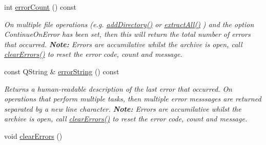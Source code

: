 \begin{DoxyCompactItemize}
int \hyperlink{class_ab_zip_ae32a8a92d2cc267e2c57705e95fafc05}{error\+Count} () const 
\begin{DoxyCompactList}\small\item\em On multiple file operations (e.\+g. \hyperlink{class_ab_zip_adf2414a410a25ef82ac7349b0a2d1c97}{add\+Directory()} or \hyperlink{class_ab_zip_ac32a9ad3665fea51a0d3977e251ade73}{extract\+All()} ) and the option Continue\+On\+Error has been set, then this will return the total number of errors that occurred. {\bfseries Note\+:} Errors are accumilative whilst the archive is open, call \hyperlink{class_ab_zip_a4e08361f95e0bc46aae1599232674230}{clear\+Errors()} to reset the error code, count and message. \end{DoxyCompactList}\item 
const Q\+String \& \hyperlink{class_ab_zip_a218ae44456c9e7518ad22fb9f8fd7466}{error\+String} () const 
\begin{DoxyCompactList}\small\item\em Returns a human-\/readable description of the last error that occurred. On operations that perform multiple tasks, then multiple error messsages are returned separated by a new line character. {\bfseries Note\+:} Errors are accumilative whilst the archive is open, call \hyperlink{class_ab_zip_a4e08361f95e0bc46aae1599232674230}{clear\+Errors()} to reset the error code, count and message. \end{DoxyCompactList}\item 
void \hyperlink{class_ab_zip_a4e08361f95e0bc46aae1599232674230}{clear\+Errors} ()\hypertarget{class_ab_zip_a4e08361f95e0bc46aae1599232674230}{}\label{class_ab_zip_a4e08361f95e0bc46aae1599232674230}


\end{DoxyCompactItemize}
